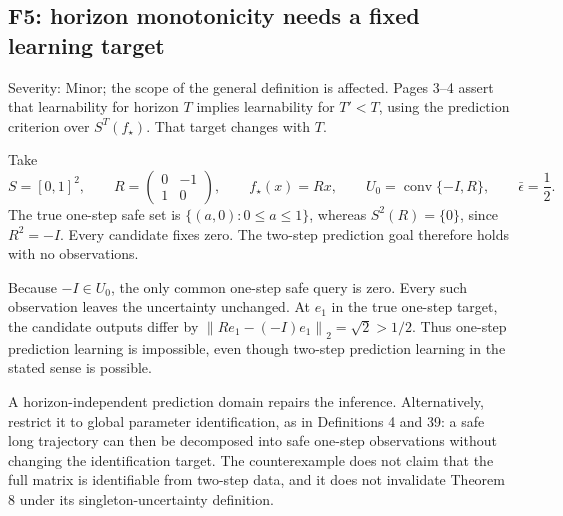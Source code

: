 \documentclass[10pt]{article}
\begin{document}
\subsection*{F5: horizon monotonicity needs a fixed learning target}
Severity: Minor; the scope of the general definition is affected. Pages 3–4 assert that learnability for horizon \(T\) implies learnability for \(T'<T\), using the prediction criterion over \(S^T(f_\star)\). That target changes with \(T\).\par
Take \[S=[0,1]^2,\qquad
 R=\begin{pmatrix}0&-1\\1&0\end{pmatrix},\qquad
 f_\star(x)=Rx,\qquad U_0=\operatorname{conv}\{-I,R\},\qquad
 \bar\epsilon=\frac12.\] The true one-step safe set is \(\{(a,0):0\le a\le1\}\), whereas \(S^2(R)=\{0\}\), since \(R^2=-I\). Every candidate fixes zero. The two-step prediction goal therefore holds with no observations.\par
Because \(-I\in U_0\), the only common one-step safe query is zero. Every such observation leaves the uncertainty unchanged. At \(e_1\) in the true one-step target, the candidate outputs differ by \(\left\lVert Re_1-(-I)e_1\right\rVert_2=\sqrt2>1/2\). Thus one-step prediction learning is impossible, even though two-step prediction learning in the stated sense is possible.\par
A horizon-independent prediction domain repairs the inference. Alternatively, restrict it to global parameter identification, as in Definitions 4 and 39: a safe long trajectory can then be decomposed into safe one-step observations without changing the identification target. The counterexample does not claim that the full matrix is identifiable from two-step data, and it does not invalidate Theorem 8 under its singleton-uncertainty definition.\par
\end{document}

